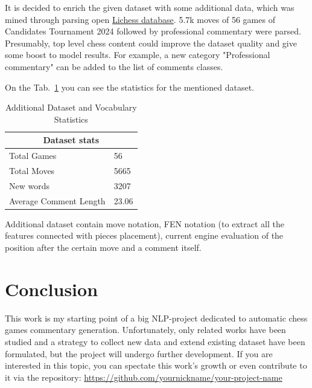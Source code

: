 \documentclass{article}
\begin{document}
It is decided to enrich the given dataset with some additional data, which was mined through parsing open \href{https://database.lichess.org/}{Lichess database}. 5.7k moves of 56 games of Candidates Tournament 2024 followed by professional commentary were parsed. Presumably, top level chess content could improve the dataset quality and give some boost to model results. For example, a new category "Professional commentary" can be added to the list of comments classes.

On the Tab.~\ref{table:statistics} you can see the statistics for the mentioned dataset.

\begin{table}
\centering
\begin{tabular}{|p{3cm}|p{1cm}|}
\hline
\multicolumn{2}{|c|}{Dataset stats} \\
\hline
Total Games & 56 \\
Total Moves & 5665 \\
\hline
New words & 3207 \\
\hline
Average Comment Length & 23.06   \\
\hline
\end{tabular}
\caption{Additional Dataset and Vocabulary Statistics}
\label{table:statistics}
\end{table}

Additional dataset contain move notation, FEN notation (to extract all the features connected with pieces placement), current engine evaluation of the position after the certain move and a comment itself. 

\section{Conclusion}
This work is my starting point of a big NLP-project dedicated to automatic chess games commentary generation. Unfortunately, only related works have been studied and a strategy to collect new data and extend existing dataset have been formulated, but the project will undergo further development. If you are interested in this topic, you can spectate this work's growth or even contribute to it via the repository: \url{https://github.com/yournickname/your-project-name}

% 
% 

\printbibliography %
\end{document}
